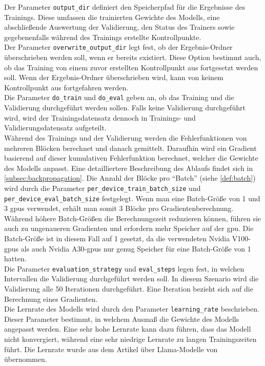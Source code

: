 Der Parameter \texttt{output\_dir} definiert den Speicherpfad für die Ergebnisse des Trainings.
Diese umfassen die trainierten Gewichte des Modells, eine abschließende Auswertung der Validierung, den Status des Trainers sowie gegebenenfalls während des Trainings erstellte Kontrollpunkte.\\

Der Parameter \texttt{overwrite\_output\_dir} legt fest, ob der Ergebnis-Ordner überschrieben werden soll, wenn er bereits existiert.
Diese Option bestimmt auch, ob das Training von einem zuvor erstellten Kontrollpunkt aus fortgesetzt werden soll.
Wenn der Ergebnis-Ordner überschrieben wird, kann von keinem Kontrollpunkt aus fortgefahren werden.\\

Die Parameter \texttt{do\_train} und \texttt{do\_eval} geben an, ob das Training und die Validierung durchgeführt werden sollen.
Falls keine Validierung durchgeführt wird, wird der Trainingsdatensatz dennoch in Trainings- und Validierungsdatensatz aufgeteilt.\\

Während des Trainings und der Validierung werden die Fehlerfunktionen von mehreren Blöcken berechnet und danach gemittelt.
Daraufhin wird ein Gradient basierend auf dieser kumulativen Fehlerfunktion berechnet, welcher die Gewichte des Modells anpasst.
Eine detailliertere Beschreibung des Ablaufs findet sich in \cref{subsec:backpropagation}.
Die Anzahl der Blöcke pro \enquote{Batch} (siehe \cref{def:batch}) wird durch die Parameter \texttt{per\_device\_train\_batch\_size} und \texttt{per\_device\_eval\_batch\_size} festgelegt.
Wenn man eine Batch-Größe von 1 und 3 \ac{gpu}s verwendet, erhält man somit 3 Blöcke pro Gradientenberechnung.
Während höhere Batch-Größen die Berechnungszeit reduzieren können, führen sie auch zu ungenaueren Gradienten und erfordern mehr Speicher auf der \ac{gpu}.
Die Batch-Größe ist in diesem Fall auf 1 gesetzt, da die verwendeten Nvidia V100-\ac{gpu}s als auch Nvidia A30-\ac{gpu}s nur genug Speicher für eine Batch-Größe von 1 hatten.\\

Die Parameter \texttt{evaluation\_strategy} und \texttt{eval\_steps} legen fest, in welchen Intervallen die Validierung durchgeführt werden soll.
In diesem Szenario wird die Validierung alle 50 Iterationen durchgeführt.
Eine Iteration bezieht sich auf die Berechnung eines Gradienten.\\

Die Lernrate des Modells wird durch den Parameter \texttt{learning\_rate} beschrieben.
Dieser Parameter bestimmt, in welchem Ausmaß die Gewichte des Modells angepasst werden.
Eine sehr hohe Lernrate kann dazu führen, dass das Modell nicht konvergiert, während eine sehr niedrige Lernrate zu langen Trainingszeiten führt.
Die Lernrate wurde aus dem Artikel über Llama-Modelle von \citet{llama} übernommen.\\

